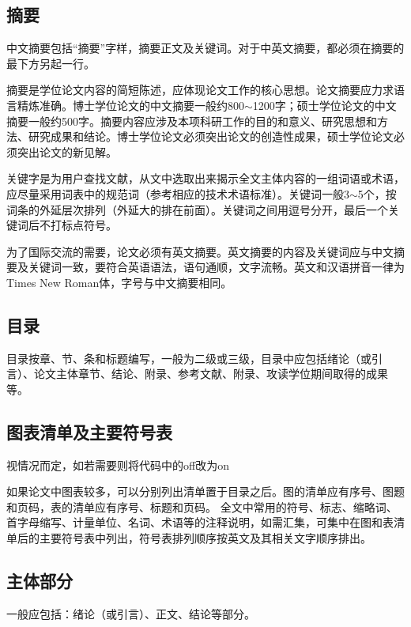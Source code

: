 \subsection{摘要}

中文摘要包括“摘要”字样，摘要正文及关键词。对于中英文摘要，都必须在摘要的最下方另起一行。

摘要是学位论文内容的简短陈述，应体现论文工作的核心思想。论文摘要应力求语言精炼准确。博士学位论文的中文摘要一般约800$\sim$1200字；硕士学位论文的中文摘要一般约500字。摘要内容应涉及本项科研工作的目的和意义、研究思想和方法、研究成果和结论。博士学位论文必须突出论文的创造性成果，硕士学位论文必须突出论文的新见解。

关键字是为用户查找文献，从文中选取出来揭示全文主体内容的一组词语或术语，应尽量采用词表中的规范词（参考相应的技术术语标准）。关键词一般3$\sim$5个，按词条的外延层次排列（外延大的排在前面）。关键词之间用逗号分开，最后一个关键词后不打标点符号。

为了国际交流的需要，论文必须有英文摘要。英文摘要的内容及关键词应与中文摘要及关键词一致，要符合英语语法，语句通顺，文字流畅。英文和汉语拼音一律为Times New Roman体，字号与中文摘要相同。

\subsection{目录}

目录按章、节、条和标题编写，一般为二级或三级，目录中应包括绪论（或引言）、论文主体章节、结论、附录、参考文献、附录、攻读学位期间取得的成果等。

\subsection{图表清单及主要符号表}
视情况而定，如若需要则将代码中的off改为on

如果论文中图表较多，可以分别列出清单置于目录之后。图的清单应有序号、图题和页码，表的清单应有序号、标题和页码。
全文中常用的符号、标志、缩略词、首字母缩写、计量单位、名词、术语等的注释说明，如需汇集，可集中在图和表清单后的主要符号表中列出，符号表排列顺序按英文及其相关文字顺序排出。

\subsection{主体部分}

一般应包括：绪论（或引言）、正文、结论等部分。

